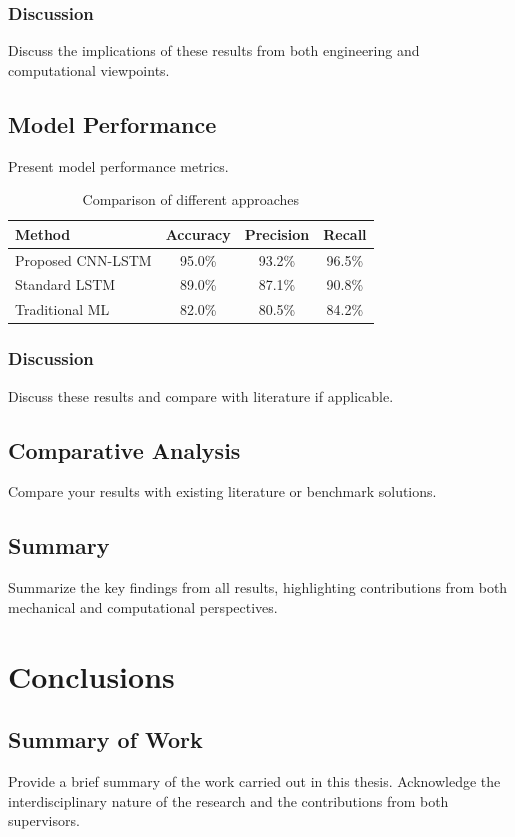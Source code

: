 \documentclass[12pt,a4paper]{report}
\begin{document}
\subsection{Discussion}
Discuss the implications of these results from both engineering and computational viewpoints.

\section{Model Performance}
Present model performance metrics.

\begin{table}[h]
\centering
\caption{Comparison of different approaches}
\label{tab:result1}
\begin{tabular}{|l|c|c|c|}
\hline
\textbf{Method} & \textbf{Accuracy} & \textbf{Precision} & \textbf{Recall} \\
\hline
Proposed CNN-LSTM & 95.0\% & 93.2\% & 96.5\% \\
\hline
Standard LSTM & 89.0\% & 87.1\% & 90.8\% \\
\hline
Traditional ML & 82.0\% & 80.5\% & 84.2\% \\
\hline
\end{tabular}
\end{table}

\subsection{Discussion}
Discuss these results and compare with literature if applicable.

\section{Comparative Analysis}
Compare your results with existing literature or benchmark solutions.

\section{Summary}
Summarize the key findings from all results, highlighting contributions from both mechanical and computational perspectives.

\chapter{Conclusions}
\label{ch:conclusions}

\section{Summary of Work}
Provide a brief summary of the work carried out in this thesis.
Acknowledge the interdisciplinary nature of the research and the contributions from both supervisors.
\end{document}
